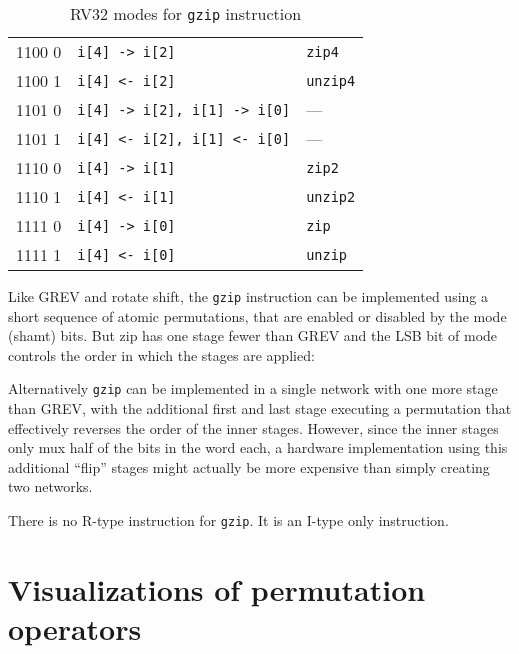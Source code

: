 \begin{table}[h]
\begin{small}
\begin{center}
\begin{tabular}{c l l}
\hline

      1100 0  & {\tt i[4] -> i[2]}               & {\tt zip4} \\
      1100 1  & {\tt i[4] <- i[2]}               & {\tt unzip4} \\
      1101 0  & {\tt i[4] -> i[2], i[1] -> i[0]} & --- \\
      1101 1  & {\tt i[4] <- i[2], i[1] <- i[0]} & --- \\
      1110 0  & {\tt i[4] -> i[1]}               & {\tt zip2} \\
      1110 1  & {\tt i[4] <- i[1]}               & {\tt unzip2} \\
      1111 0  & {\tt i[4] -> i[0]}               & {\tt zip} \\
      1111 1  & {\tt i[4] <- i[0]}               & {\tt unzip} \\
\end{tabular}
\end{center}
\end{small}
\caption{RV32 modes for {\tt gzip} instruction}
\label{gzip-modes}
\end{table}

Like GREV and rotate shift, the {\tt gzip} instruction can be implemented using a short
sequence of atomic permutations, that are enabled or disabled by the mode (shamt)
bits. But zip has one stage fewer than GREV and the LSB bit of mode controls the order
in which the stages are applied:



Alternatively {\tt gzip} can be implemented in a single network with one more
stage than GREV, with the additional first and last stage executing a
permutation that effectively reverses the order of the inner stages. However,
since the inner stages only mux half of the bits in the word each, a hardware
implementation using this additional ``flip'' stages might actually be more
expensive than simply creating two networks.



There is no R-type instruction for {\tt gzip}. It is an I-type only instruction.


\section{Visualizations of permutation operators}


